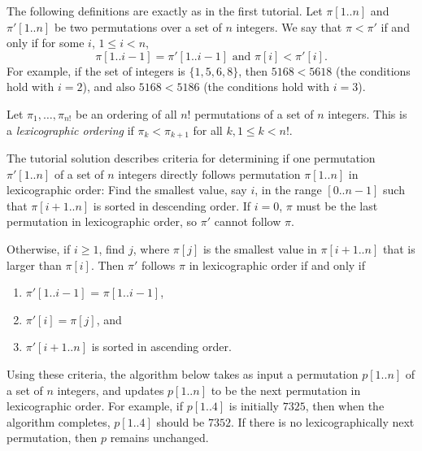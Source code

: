 \documentclass[11pt]{article}
\begin{document}
 The following definitions are exactly as in the first tutorial.
  Let $\pi[1..n]$ and $\pi'[1..n]$ be two permutations over a set of
$n$ integers. We say that $\pi < \pi'$ if and only if
for some $i$, $1\le i < n$,
\begin{equation}
\label{lessthan}
\pi[1..i-1] = \pi'[1..i-1] \mbox{ and } \pi[i] < \pi'[i].
\end{equation}
For example, if the set of integers is $\{1,5,6,8\}$, then
$5168 < 5618$ (the conditions hold with $i=2$), and also
$5168 < 5186$  (the conditions hold with $i=3$).

Let $\pi_1, \ldots, \pi_{n!}$ be an ordering of all $n!$ permutations
of a set of $n$ integers. This is a \emph{lexicographic ordering} if
$\pi_k < \pi_{k+1}$ for all $k, 1 \le k < n!$.

The tutorial solution describes criteria for
determining if one permutation $\pi'[1..n]$ of a set of $n$ integers
directly follows permutation
$\pi[1..n]$ in lexicographic order:
Find the smallest value, say $i$, in the range
$[0..n-1]$ such that $\pi[i+1..n]$ is sorted in descending order.
If $i=0$, $\pi$ must be the last permutation in lexicographic order,
so $\pi'$ cannot follow $\pi$.

Otherwise, if $i \ge 1$, 
find $j$, where $\pi[j]$ is the smallest value in $\pi[i+1..n]$ that
is larger than $\pi[i]$.
Then $\pi'$ follows $\pi$ in lexicographic order if and only if
\begin{enumerate}
\item
  $\pi'[1..i-1]$ = $\pi[1..i-1]$,
\item
  $\pi'[i] = \pi[j]$, and
\item  
  $\pi'[i+1..n]$ is sorted in ascending order.
\end{enumerate}

Using these criteria, the algorithm below takes
as input a permutation $p[1..n]$ of a set of
$n$ integers, and updates $p[1..n]$ to be the next permutation in lexicographic order. For example, if $p[1..4]$ is initially $7325$, then when
the algorithm completes, $p[1..4]$ should be $7352$.  If
there is no lexicographically next permutation, then $p$
remains unchanged.

\vspace{.2in}
\end{document}
